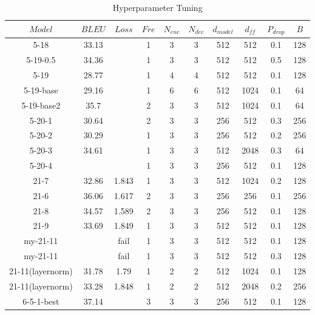 \documentclass{article}
\begin{document}
\begin{table}[H]
    \caption{Hyperparameter Tuning}
    \centering %
    \label{tab:tuning}
    \begin{tabular}{c|c|cccccccc}
    \hline
    \textbf{$Model$} & \textbf{$BLEU$} & \textbf{$Loss$} & \textbf{$Fre$} & \textbf{$N_{enc}$} & \textbf{$N_{dec}$} & \textbf{$d_{model}$} & \textbf{$d_{ff}$} & \textbf{$P_{drop}$} & \textbf{$B$} \\ \hline
    5-18 & 33.13 &  & 1 & 3 & 3 & 512 & 512 & 0.1 & 128 \\
    5-19-0.5 & 34.36 &  & 1 & 3 & 3 & 512 & 512 & 0.5 & 128 \\
    5-19 & 28.77 &  & 1 & 4 & 4 & 512 & 512 & 0.1 & 128 \\
    5-19-base & 29.16 &  & 1 & 6 & 6 & 512 & 1024 & 0.1 & 64 \\
    5-19-base2 & 35.7 &  & 2 & 3 & 3 & 512 & 1024 & 0.1 & 64 \\
    5-20-1 & 30.64 &  & 2 & 3 & 3 & 256 & 512 & 0.3 & 256 \\
    5-20-2 & 30.29 &  & 1 & 3 & 3 & 256 & 512 & 0.2 & 256 \\
    5-20-3 & 34.61 &  & 1 & 3 & 3 & 512 & 2048 & 0.3 & 64 \\
    5-20-4 &  &  & 1 & 3 & 3 & 256 & 512 & 0.1 & 128 \\ \hline
    21-7 & 32.86 & 1.843 & 1 & 3 & 3 & 512 & 1024 & 0.2 & 128 \\
    21-6 & 36.06 & 1.617 & 2 & 3 & 3 & 256 & 256 & 0.1 & 256 \\
    21-8 & 34.57 & 1.589 & 2 & 3 & 3 & 256 & 512 & 0.1 & 128 \\
    21-9 & 33.69 & 1.849 & 1 & 3 & 3 & 512 & 512 & 0.1 & 128 \\
    my-21-11 &  & fail & 1 & 3 & 3 & 512 & 512 & 0.1 & 128 \\
    my-21-11 &  & fail & 1 & 3 & 3 & 512 & 512 & 0.3 & 128 \\
    21-11(layernorm) & 31.78 & 1.79 & 1 & 2 & 2 & 512 & 1024 & 0.1 & 128 \\
    21-11(layernorm) & 33.28 & 1.848 & 1 & 2 & 2 & 512 & 2048 & 0.2 & 256 \\ \hline
    6-5-1-best & 37.14 &  & 3 & 3 & 3 & 256 & 512 & 0.1 & 128 \\ \hline
    \end{tabular}
\end{table}
\end{document}
